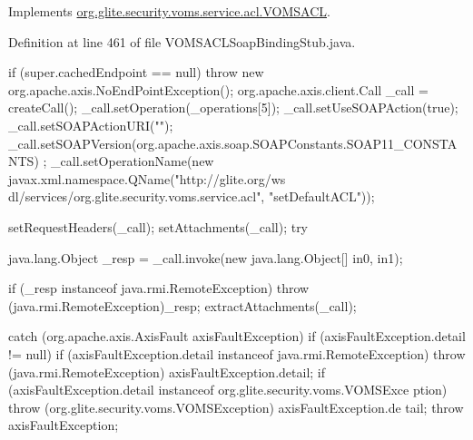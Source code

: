 \label{classorg_1_1glite_1_1security_1_1voms_1_1service_1_1acl_1_1VOMSACLSoapBindingStub_a3df9eb65a23828d2ac020cc2c39e7758}


Implements \hyperlink{interfaceorg_1_1glite_1_1security_1_1voms_1_1service_1_1acl_1_1VOMSACL_a74de4a5ebe11f2f04c1368e650324251}{org.glite.security.voms.service.acl.VOMSACL}.



Definition at line 461 of file VOMSACLSoapBindingStub.java.


\begin{DoxyCode}
                                                                                 
                                                                                       
                   {
        if (super.cachedEndpoint == null) {
            throw new org.apache.axis.NoEndPointException();
        }
        org.apache.axis.client.Call _call = createCall();
        _call.setOperation(_operations[5]);
        _call.setUseSOAPAction(true);
        _call.setSOAPActionURI("");
        _call.setSOAPVersion(org.apache.axis.soap.SOAPConstants.SOAP11_CONSTANTS)
      ;
        _call.setOperationName(new javax.xml.namespace.QName("http://glite.org/ws
      dl/services/org.glite.security.voms.service.acl", "setDefaultACL"));

        setRequestHeaders(_call);
        setAttachments(_call);
 try {        java.lang.Object _resp = _call.invoke(new java.lang.Object[] {in0, 
      in1});

        if (_resp instanceof java.rmi.RemoteException) {
            throw (java.rmi.RemoteException)_resp;
        }
        extractAttachments(_call);
  } catch (org.apache.axis.AxisFault axisFaultException) {
    if (axisFaultException.detail != null) {
        if (axisFaultException.detail instanceof java.rmi.RemoteException) {
              throw (java.rmi.RemoteException) axisFaultException.detail;
         }
        if (axisFaultException.detail instanceof org.glite.security.voms.VOMSExce
      ption) {
              throw (org.glite.security.voms.VOMSException) axisFaultException.de
      tail;
         }
   }
  throw axisFaultException;
}
    }
\end{DoxyCode}


